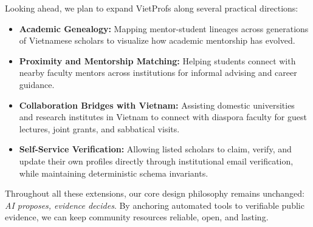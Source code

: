 \documentclass[11pt]{article}
\begin{document}
Looking ahead, we plan to expand VietProfs along several practical directions:
\begin{itemize}
\item \textbf{Academic Genealogy:} Mapping mentor-student lineages across generations of Vietnamese scholars to visualize how academic mentorship has evolved.
\item \textbf{Proximity and Mentorship Matching:} Helping students connect with nearby faculty mentors across institutions for informal advising and career guidance.
\item \textbf{Collaboration Bridges with Vietnam:} Assisting domestic universities and research institutes in Vietnam to connect with diaspora faculty for guest lectures, joint grants, and sabbatical visits.
\item \textbf{Self-Service Verification:} Allowing listed scholars to claim, verify, and update their own profiles directly through institutional email verification, while maintaining deterministic schema invariants.
\end{itemize}

Throughout all these extensions, our core design philosophy remains unchanged: \emph{AI proposes, evidence decides}.
By anchoring automated tools to verifiable public evidence, we can keep community resources reliable, open, and lasting.

\clearpage


\end{document}
